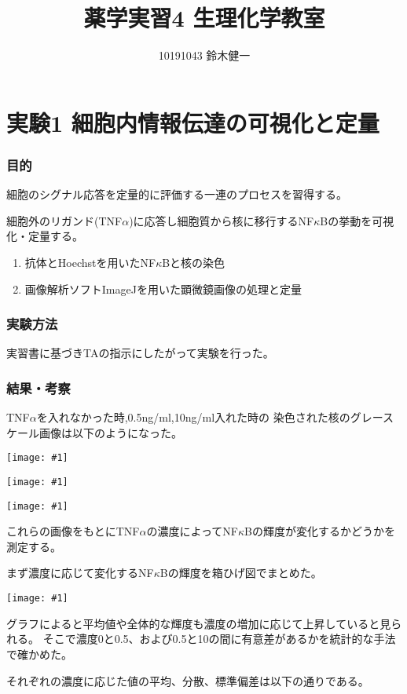 \documentclass[a4paper,papersize,dvipdfmx]{jsarticle}
\newcommand{\pict}[2]{\begin{center} \texttt{[image: \#1]} \end{center}}   %
\begin{document}
\title{薬学実習4 生理化学教室}
\author{10191043 鈴木健一}
\date{}
\maketitle


\part*{実験1 細胞内情報伝達の可視化と定量}

\section*{目的}
細胞のシグナル応答を定量的に評価する一連のプロセスを習得する。

細胞外のリガンド(TNF$\alpha$)に応答し細胞質から核に移行するNF$\kappa$Bの挙動を可視化・定量する。

\begin{enumerate}
\item 抗体とHoechstを用いたNF$\kappa$Bと核の染色

\item 画像解析ソフトImageJを用いた顕微鏡画像の処理と定量

\end{enumerate}
\section*{実験方法}
実習書に基づきTAの指示にしたがって実験を行った。

\section*{結果・考察}
TNF$\alpha$を入れなかった時,0.5ng/ml,10ng/ml入れた時の
染色された核のグレースケール画像は以下のようになった。
\pict{images/NoTNFa.png}{4}
\pict{images/TNFa_05ng.png}{4}
\pict{images/TNFa_10ng.png}{4}

これらの画像をもとにTNF$\alpha$の濃度によってNF$\kappa$Bの輝度が変化するかどうかを測定する。

まず濃度に応じて変化するNF$\kappa$Bの輝度を箱ひげ図でまとめた。
\pict{images/graph1.png}{8}
グラフによると平均値や全体的な輝度も濃度の増加に応じて上昇していると見られる。
そこで濃度0と0.5、および0.5と10の間に有意差があるかを統計的な手法で確かめた。

それぞれの濃度に応じた値の平均、分散、標準偏差は以下の通りである。
\end{document}
